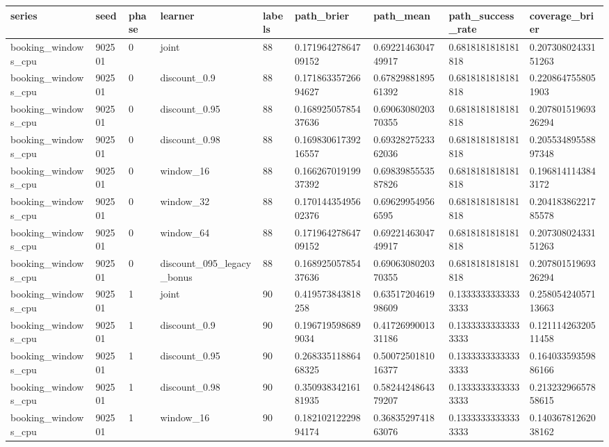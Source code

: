 \begin{tabular}{lllllllll}
series & seed & phase & learner & labels & path\_brier & path\_mean & path\_success\_rate & coverage\_brier \\
\hline
booking\_windows\_cpu & 902501 & 0 & joint & 88 & 0.17196427864709152 & 0.6922146304749917 & 0.6818181818181818 & 0.20730802433151263 \\
booking\_windows\_cpu & 902501 & 0 & discount\_0.9 & 88 & 0.17186335726694627 & 0.6782988189561392 & 0.6818181818181818 & 0.2208647558051903 \\
booking\_windows\_cpu & 902501 & 0 & discount\_0.95 & 88 & 0.16892505785437636 & 0.6906308020370355 & 0.6818181818181818 & 0.20780151969326294 \\
booking\_windows\_cpu & 902501 & 0 & discount\_0.98 & 88 & 0.16983061739216557 & 0.6932827523362036 & 0.6818181818181818 & 0.20553489558897348 \\
booking\_windows\_cpu & 902501 & 0 & window\_16 & 88 & 0.16626701919937392 & 0.6983985553587826 & 0.6818181818181818 & 0.1968141143843172 \\
booking\_windows\_cpu & 902501 & 0 & window\_32 & 88 & 0.17014435495602376 & 0.696299549566595 & 0.6818181818181818 & 0.20418386221785578 \\
booking\_windows\_cpu & 902501 & 0 & window\_64 & 88 & 0.17196427864709152 & 0.6922146304749917 & 0.6818181818181818 & 0.20730802433151263 \\
booking\_windows\_cpu & 902501 & 0 & discount\_095\_legacy\_bonus & 88 & 0.16892505785437636 & 0.6906308020370355 & 0.6818181818181818 & 0.20780151969326294 \\
booking\_windows\_cpu & 902501 & 1 & joint & 90 & 0.419573843818258 & 0.6351720461998609 & 0.13333333333333333 & 0.25805424057113663 \\
booking\_windows\_cpu & 902501 & 1 & discount\_0.9 & 90 & 0.1967195986899034 & 0.4172699001331186 & 0.13333333333333333 & 0.12111426320511458 \\
booking\_windows\_cpu & 902501 & 1 & discount\_0.95 & 90 & 0.26833511886468325 & 0.5007250181016377 & 0.13333333333333333 & 0.16403359359886166 \\
booking\_windows\_cpu & 902501 & 1 & discount\_0.98 & 90 & 0.35093834216181935 & 0.5824424864379207 & 0.13333333333333333 & 0.21323296657858615 \\
booking\_windows\_cpu & 902501 & 1 & window\_16 & 90 & 0.18210212229894174 & 0.3683529741863076 & 0.13333333333333333 & 0.14036781262038162 \\

\end{tabular}
